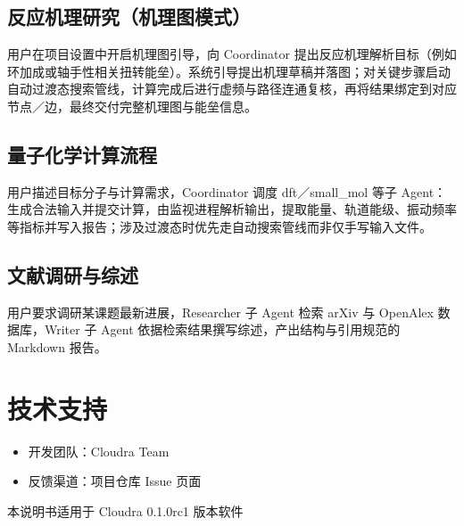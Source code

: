 \documentclass[zihao=-4,a4paper,fontset=none]{ctexart}
\begin{document}
\subsection{反应机理研究（机理图模式）}
用户在项目设置中开启机理图引导，向 Coordinator 提出反应机理解析目标（例如环加成或轴手性相关扭转能垒）。系统引导提出机理草稿并落图；对关键步骤启动自动过渡态搜索管线，计算完成后进行虚频与路径连通复核，再将结果绑定到对应节点／边，最终交付完整机理图与能垒信息。

\subsection{量子化学计算流程}
用户描述目标分子与计算需求，Coordinator 调度 dft／small\_mol 等子 Agent：生成合法输入并提交计算，由监视进程解析输出，提取能量、轨道能级、振动频率等指标并写入报告；涉及过渡态时优先走自动搜索管线而非仅手写输入文件。

\subsection{文献调研与综述}
用户要求调研某课题最新进展，Researcher 子 Agent 检索 arXiv 与 OpenAlex 数据库，Writer 子 Agent 依据检索结果撰写综述，产出结构与引用规范的 Markdown 报告。

\section{技术支持}
\begin{itemize}[leftmargin=4em,itemsep=2pt]
  \item 开发团队：Cloudra Team
  \item 反馈渠道：项目仓库 Issue 页面
\end{itemize}

\vfill
\begin{center}
\small 本说明书适用于 Cloudra 0.1.0rc1 版本软件
\end{center}
\end{document}
